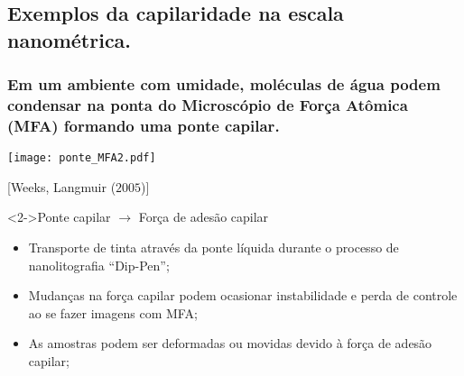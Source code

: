 \documentclass[8pt]{beamer}
\begin{document}
\subsection{Exemplos da capilaridade na escala nanométrica.}

\begin{frame}
	\frametitle{Em um ambiente com umidade, \textbf{moléculas de água podem condensar} na ponta do Microscópio de Força Atômica (MFA) \textbf{formando uma ponte capilar}.}
	\vspace{-0.3cm}
		\begin{center}
			\texttt{[image: ponte\_MFA2.pdf]}
			
				\tiny{[Weeks, Langmuir ($2005$)]}
		\end{center}
	\begin{minipage}{0.47\textwidth}
		\begin{center}
		\end{center}
	\end{minipage}
	\begin{minipage}{0.5\textwidth}
		\begin{block}<2->{Ponte capilar $\rightarrow$ Força de adesão capilar}
			\begin{itemize}
			    \item<3-> Transporte de tinta através da ponte líquida durante o processo de nanolitografia ``Dip-Pen'';
			    \item<4-> Mudanças na força capilar podem ocasionar instabilidade e perda de controle ao se fazer imagens com MFA;
			    \item<5-> As amostras podem ser deformadas ou movidas devido à força de adesão capilar;
			\end{itemize}
		\end{block}
	\end{minipage}
\end{frame}
\end{document}
